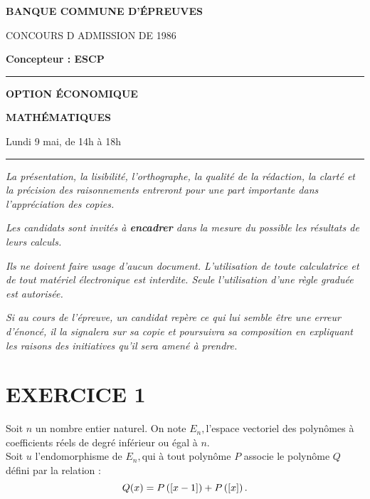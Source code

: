 \documentclass[11pt]{article}%
\begin{document}

\begin{center}
{\LARG\E\textbf{BANQUE COMMUNE D'ÉPREUVES}}



{\large \textsc{CONCOURS D ADMISSION DE 1986}}



{\large \textbf{Concepteur : ESCP}}



\rule{2.39cm}{0.05cm}



{\Large \textbf{OPTION ÉCONOMIQUE}}



{\Large \textbf{MATHÉMATIQUES }}



{\Large Lundi 9 mai, de 14h à 18h}



\rule{2.39cm}{0.05cm}
\end{center}

\textit{La présentation, la lisibilité, l'orthographe, la qualité
de la rédaction, la clarté et la précision des raisonnements
entreront pour une part importante dans l'appréciation des copies.}

\textit{Les candidats sont invités à \textbf{encadrer} dans la mesure
du possible les résultats de leurs calculs.}

\textit{Ils ne doivent faire usage d'aucun document. L'utilisation de
toute
calculatrice et de tout matériel électronique est interdite. Seule
l'utilisation d'une règle graduée est autorisée.}

\textit{Si au cours de l'épreuve, un candidat repère ce qui lui semble
être une erreur d'énoncé, il la signalera sur sa copie et
poursuivra sa composition en expliquant les raisons des initiatives
qu'il sera
amené à prendre.}

\vspace*{3cm}

\section*{EXERCICE 1}

Soit $n$ un nombre entier naturel. On note $E_{n},$l'espace vectoriel
des
polynômes à coefficients réels de degré inférieur ou égal à $n$.\\
Soit $u$ l'endomorphisme de $E_{n},$qui à tout polynôme $P$ associe le
polynôme $Q$ défini par la relation :
\[
Q(x) = P\left(\left[ {x-1} \right]\right) + P\left(\left[ {x} \right]\right).
\]
\end{document}
